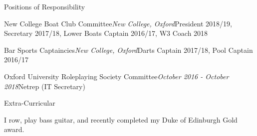 \documentclass{resume} %
\begin{document}
\begin{rSection}{Positions of Responsibility}

\begin{rSubsectionNoContent}{New College Boat Club Committee}{\em New College, Oxford}{President 2018/19, Secretary 2017/18, Lower Boats Captain 2016/17, W3 Coach 2018}{}
\end{rSubsectionNoContent}


\begin{rSubsectionNoContent}{Bar Sports Captaincies}{\em New College, Oxford}{Darts Captain 2017/18, Pool Captain 2016/17}{}
\end{rSubsectionNoContent}


\begin{rSubsectionNoContent}{Oxford University Roleplaying Society Committee}{\em October 2016 - October 2018}{Netrep (IT Secretary)}{}
\end{rSubsectionNoContent}

\end{rSection}


\begin{rSection}{Extra-Curricular} \itemsep -3pt
\item I row, play bass guitar, and recently completed my Duke of Edinburgh Gold award.

\end{rSection}
\end{document}
